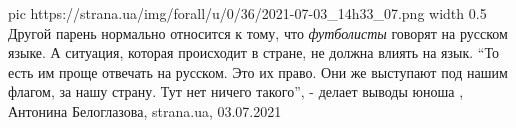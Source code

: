 \ifcmt
  pic https://strana.ua/img/forall/u/0/36/2021-07-03_14h33_07.png
	width 0.5
\fi
Другой парень нормально относится к тому, что \emph{футболисты} говорят на русском
языке. А ситуация, которая происходит в стране, не должна влиять на язык. 
\enquote{То есть им проще отвечать на русском. Это их право. Они же выступают под нашим
флагом, за нашу страну. Тут нет ничего такого}, - делает выводы юноша
, 
Антонина Белоглазова, strana.ua, 03.07.2021
